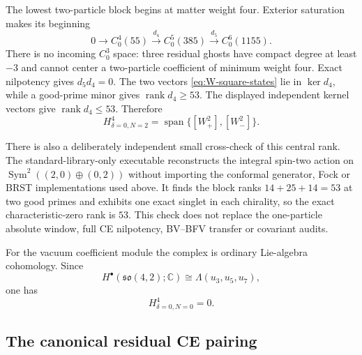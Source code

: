 \documentclass[11pt]{article}
\theoremstyle{definition}
\theoremstyle{remark}
\newcommand{\C}{\mathbb C}
\newcommand{\rank}{\operatorname{rank}}
\begin{document}
The lowest two-particle block begins at matter weight four.  Exterior
saturation makes its beginning
\begin{equation}\label{eq:two-particle-complex}
 0\longrightarrow C^4_0(55)
 \xrightarrow{d_4}C^5_0(385)
 \xrightarrow{d_5}C^6_0(1155).
\end{equation}
There is no incoming $C^3_0$ space: three residual ghosts have compact
degree at least $-3$ and cannot center a two-particle coefficient of minimum
weight four.  Exact nilpotency gives $d_5d_4=0$.
The two vectors \eqref{eq:W-square-states} lie in $\ker d_4$, while a
good-prime minor gives $\rank d_4\ge53$.  The displayed independent kernel
vectors give $\rank d_4\le53$.  Therefore
\begin{equation}\label{eq:two-particle-H}
 H^4_{\delta=0,N=2}
 =\operatorname{span}\{[W_+^2],[W_-^2]\}.
\end{equation}

There is also a deliberately independent small cross-check of this central
rank.  The standard-library-only executable
 reconstructs
the integral spin-two action on
$\operatorname{Sym}^2((2,0)\oplus(0,2))$ without importing the conformal
generator, Fock or BRST implementations used above.  It finds the block ranks
$14+25+14=53$ at two good primes and exhibits one exact singlet in each
chirality, so the exact characteristic-zero rank is $53$.  This check does
not replace the one-particle absolute window, full CE nilpotency, BV--BFV
transfer or covariant audits.

For the vacuum coefficient module the complex is ordinary Lie-algebra
cohomology.  Since
\begin{equation}
 H^\bullet(\mathfrak{so}(4,2);\C)
 \cong\Lambda(u_3,u_5,u_7),
\end{equation}
one has
\begin{equation}\label{eq:vacuum-zero}
 H^4_{\delta=0,N=0}=0.
\end{equation}

\subsection{The canonical residual CE pairing}
\end{document}
